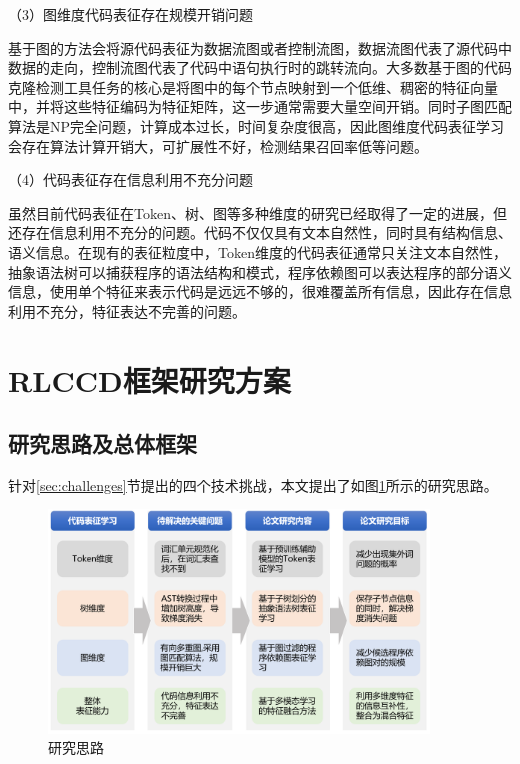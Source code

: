 （3）图维度代码表征存在规模开销问题

基于图的方法会将源代码表征为数据流图或者控制流图，数据流图代表了源代码中数据的走向，控制流图代表了代码中语句执行时的跳转流向。大多数基于图的代码克隆检测工具任务的核心是将图中的每个节点映射到一个低维、稠密的特征向量中，并将这些特征编码为特征矩阵，这一步通常需要大量空间开销。同时子图匹配算法是NP完全问题，计算成本过长，时间复杂度很高，因此图维度代码表征学习会存在算法计算开销大，可扩展性不好，检测结果召回率低等问题。

（4）代码表征存在信息利用不充分问题

虽然目前代码表征在Token、树、图等多种维度的研究已经取得了一定的进展，但还存在信息利用不充分的问题。代码不仅仅具有文本自然性，同时具有结构信息、语义信息。在现有的表征粒度中，Token维度的代码表征通常只关注文本自然性，抽象语法树可以捕获程序的语法结构和模式，程序依赖图可以表达程序的部分语义信息，使用单个特征来表示代码是远远不够的，很难覆盖所有信息，因此存在信息利用不充分，特征表达不完善的问题。

\section{RLCCD框架研究方案}
\label{sec:Framework}

\subsection{研究思路及总体框架}
\label{subsec:Ideas}
针对\ref{sec:challenges}节提出的四个技术挑战，本文提出了如图\ref{fig:thinking}所示的研究思路。

\begin{figure}[H]
    \centering
    \includegraphics[width=0.9\textwidth]{figures/thinking}
    \caption{研究思路}\label{fig:thinking}
\end{figure}

